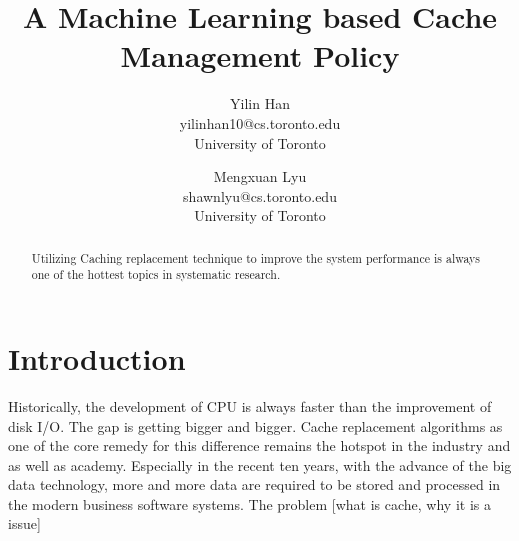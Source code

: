 \documentclass[letterpaper,twocolumn,10pt]{article}
\begin{document}

\date{}

\title{\Large \bf A Machine Learning based Cache Management Policy}

\author{
{\rm Yilin Han}\\
yilinhan10@cs.toronto.edu\\
University of Toronto
\and
{\rm Mengxuan Lyu}\\
shawnlyu@cs.toronto.edu\\
University of Toronto
} %

\maketitle

\begin{abstract}
Utilizing Caching replacement technique to improve the system performance is always one of the hottest topics in systematic research.

\end{abstract}


\section{Introduction}

Historically, the development of CPU is always faster than the improvement of disk I/O. The gap is getting bigger and bigger. Cache replacement algorithms as one of the core remedy for this difference remains the hotspot in the industry and as well as academy. Especially in the recent ten years,  with the advance of the big data technology, more and more data are required to be stored and processed in the modern business software systems. 
The problem [what is cache, why it is a issue]
\end{document}
